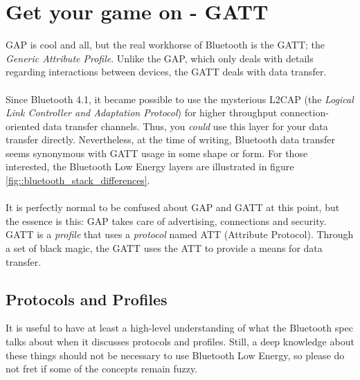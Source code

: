 \documentclass[11pt,a4paper]{article}
\begin{document}
\section{Get your game on - GATT}
GAP is cool and all, but the real workhorse of Bluetooth is the GATT; the \textit{Generic Attribute Profile}. Unlike the GAP, which only deals with details regarding interactions between devices, the GATT deals with data transfer.\\
\\
Since Bluetooth 4.1, it became possible to use the mysterious L2CAP (the \textit{Logical Link Controller and Adaptation Protocol}) for higher throughput connection-oriented data transfer channels. Thus, you \textit{could} use this layer for your data transfer directly. Nevertheless, at the time of writing, Bluetooth data transfer seems synonymous with GATT usage in some shape or form. For those interested, the Bluetooth Low Energy layers are illustrated in figure \ref{fig::bluetooth_stack_differences}.\\
\\
It is perfectly normal to be confused about GAP and GATT at this point, but the essence is this: GAP takes care of advertising, connections and security. GATT is a \textit{profile} that uses a \textit{protocol} named ATT (Attribute Protocol). Through a set of black magic, the GATT uses the ATT to provide a means for data transfer.

\subsection{Protocols and Profiles}
It is useful to have at least a high-level understanding of what the Bluetooth spec talks about when it discusses protocols and profiles. Still, a deep knowledge about these things should not be necessary to use Bluetooth Low Energy, so please do not fret if some of the concepts remain fuzzy.
\end{document}
